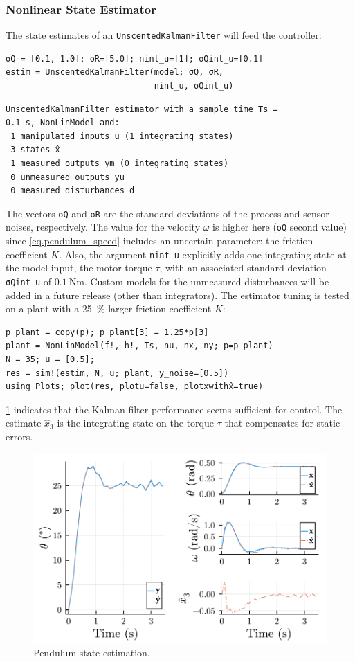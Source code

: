 \subsubsection{Nonlinear State Estimator}

The state estimates of an \texttt{UnscentedKalmanFilter} will feed the controller:
\begin{verbatim}
σQ = [0.1, 1.0]; σR=[5.0]; nint_u=[1]; σQint_u=[0.1]
estim = UnscentedKalmanFilter(model; σQ, σR, 
                              nint_u, σQint_u)
\end{verbatim}
\spacerepl
\begin{verbatim}
UnscentedKalmanFilter estimator with a sample time Ts =
0.1 s, NonLinModel and:
 1 manipulated inputs u (1 integrating states)
 3 states x̂
 1 measured outputs ym (0 integrating states)
 0 unmeasured outputs yu
 0 measured disturbances d
\end{verbatim}
The vectors \texttt{σQ} and \texttt{σR} are the standard deviations of the process and sensor noises, respectively. The value for the velocity $\omega$ is higher here (\texttt{σQ} second value) since \eqref{eq.pendulum_speed} includes an uncertain parameter: the friction coefficient $K$. Also, the argument \texttt{nint\_u} explicitly adds one integrating state at the model input, the motor torque $\tau$, with an associated standard deviation \texttt{σQint\_u} of $\SI{0.1}{\newton\meter}$. Custom models for the unmeasured disturbances will be added in a future release (other than integrators). The estimator tuning is tested on a plant with a \SI{25}{\percent} larger friction coefficient $K$: 
\begin{verbatim}
p_plant = copy(p); p_plant[3] = 1.25*p[3]
plant = NonLinModel(f!, h!, Ts, nu, nx, ny; p=p_plant)
N = 35; u = [0.5]; 
res = sim!(estim, N, u; plant, y_noise=[0.5])
using Plots; plot(res, plotu=false, plotxwithx̂=true)
\end{verbatim}
\cref{fig:plot_NonLinMPC1} indicates that the Kalman filter performance seems sufficient for control. The estimate $\hat{x}_3$ is the integrating state on the torque $\tau$ that compensates for static errors. 

\begin{figure}[ht]
    \centering
    \includegraphics[width=\columnwidth]{fig/plot_NonLinMPC1.pdf}
    \caption{Pendulum state estimation.}\label{fig:plot_NonLinMPC1}
\end{figure}

